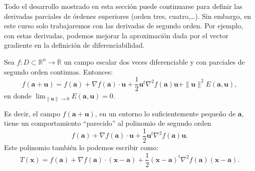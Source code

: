 Todo el desarrollo mostrado en esta sección puede continuarse para definir las derivadas parciales de órdenes superiores (orden tres, cuatro,\dots).
Sin embargo, en este curso solo trabajaremos con las derivadas de segundo orden.
Por ejemplo, con estas derivadas, podemos mejorar la aproximación dada por el vector gradiente en la definición de diferenciabilidad.
%
\begin{teorema}
Sea $f\colon \mathit{D}\subset\mathbb{R}^n\to\mathbb{R}$
un campo escalar dos veces diferenciable y con parciales de segundo orden continuas.
Entonces:
\[
f(\boldsymbol{a}+\boldsymbol{u})=
f(\boldsymbol{a})+\nabla f(\boldsymbol{a})\cdot\boldsymbol{u}
+\frac{1}{2}\boldsymbol{u}^t\nabla^2f(\boldsymbol{a})\boldsymbol{u}+
\|\boldsymbol{u}\|^2E(\boldsymbol{a},\boldsymbol{u}),
\]
en donde $\displaystyle\lim_{\|\boldsymbol{u}\|\to 0}E(\boldsymbol{a},\boldsymbol{u})=0$.
\end{teorema}
%
Es decir, el campo $f(\boldsymbol{a}+\boldsymbol{u})$, en un entorno lo suficientemente pequeño de $\boldsymbol a$, tiene un comportamiento ``parecido'' al polinomio de segundo orden
\[
f(\boldsymbol{a})+\nabla f(\boldsymbol{a})\cdot\boldsymbol{u}
+\frac{1}{2}\boldsymbol{u}^t\nabla^2f(\boldsymbol{a})\boldsymbol{u}.
\]
Este polinomio también lo podemos escribir como:
\[
T(\boldsymbol x)=f(\boldsymbol{a})+\nabla f(\boldsymbol{a})\cdot(\boldsymbol x-\boldsymbol a)
+\frac{1}{2}(\boldsymbol x-\boldsymbol a)^t\nabla^2f(\boldsymbol{a})(\boldsymbol x-\boldsymbol a).
\]
%
